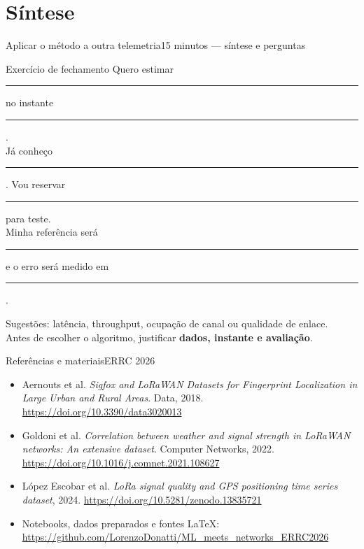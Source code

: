 \documentclass[aspectratio=169,10pt]{beamer}
\begin{document}
\section{Síntese}
\begin{frame}{Aplicar o método a outra telemetria}{15 minutos — síntese e perguntas}
\begin{block}{Exercício de fechamento}
Quero estimar \rule{2cm}{.3pt} no instante \rule{2cm}{.3pt}.\\[3mm]
Já conheço \rule{3cm}{.3pt}. Vou reservar \rule{3cm}{.3pt} para teste.\\[3mm]
Minha referência será \rule{2cm}{.3pt} e o erro será medido em \rule{2cm}{.3pt}.
\end{block}
Sugestões: latência, throughput, ocupação de canal ou qualidade de enlace.\\[3mm]
Antes de escolher o algoritmo, justificar \textbf{dados, instante e avaliação}.
\end{frame}

\begin{frame}{Referências e materiais}{ERRC 2026}
\footnotesize
\begin{itemize}
\item Aernouts et al. \emph{Sigfox and LoRaWAN Datasets for Fingerprint Localization in Large Urban and Rural Areas}. Data, 2018. \url{https://doi.org/10.3390/data3020013}
\item Goldoni et al. \emph{Correlation between weather and signal strength in LoRaWAN networks: An extensive dataset}. Computer Networks, 2022. \url{https://doi.org/10.1016/j.comnet.2021.108627}
\item López Escobar et al. \emph{LoRa signal quality and GPS positioning time series dataset}, 2024. \url{https://doi.org/10.5281/zenodo.13835721}
\item Notebooks, dados preparados e fontes LaTeX:\\
\url{https://github.com/LorenzoDonatti/ML_meets_networks_ERRC2026}
\end{itemize}
\end{frame}
\end{document}

